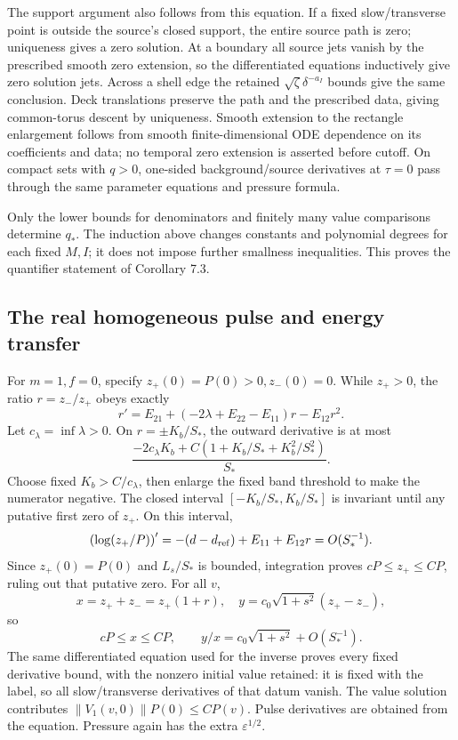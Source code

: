 \documentclass[10pt,a4paper]{article}
\begin{document}
The support argument also follows from this equation. If a fixed slow/transverse point is outside the source's closed support, the entire source path is zero; uniqueness gives a zero solution. At a boundary all source jets vanish by the prescribed smooth zero extension, so the differentiated equations inductively give zero solution jets. Across a shell edge the retained \(\sqrt\zeta\delta^{-a_I}\) bounds give the same conclusion. Deck translations preserve the path and the prescribed data, giving common-torus descent by uniqueness. Smooth extension to the rectangle enlargement follows from smooth finite-dimensional ODE dependence on its coefficients and data; no temporal zero extension is asserted before cutoff. On compact sets with \(q>0\), one-sided background/source derivatives at \(\tau=0\) pass through the same parameter equations and pressure formula.

Only the lower bounds for denominators and finitely many value comparisons determine \(q_*\). The induction above changes constants and polynomial degrees for each fixed \(M,I\); it does not impose further smallness inequalities. This proves the quantifier statement of Corollary 7.3.

\subsection{The real homogeneous pulse and energy transfer}\label{si:the-real-homogeneous-pulse-and-energy-transfer}

For \(m=1,f=0\), specify \(z_+(0)=P(0)>0,z_-(0)=0\). While \(z_+>0\), the ratio \(r=z_-/z_+\) obeys exactly \[
r'=E_{21}+(-2\lambda+E_{22}-E_{11})r-E_{12}r^2.
\] Let \(c_\lambda=\inf\lambda>0\). On \(r=\pm K_b/S_*\), the outward derivative is at most \[
\frac{-2c_\lambda K_b+C(1+K_b/S_*+K_b^2/S_*^2)}{S_*}.
\] Choose fixed \(K_b>C/c_\lambda\), then enlarge the fixed band threshold to make the numerator negative. The closed interval \([-K_b/S_*,K_b/S_*]\) is invariant until any putative first zero of \(z_+\). On this interval, \[
\left(\log(z_+/P)\right)'=-(d-d_{\rm ref})+E_{11}+E_{12}r=O(S_*^{-1}).
\] Since \(z_+(0)=P(0)\) and \(L_s/S_*\) is bounded, integration proves \(cP\le z_+\le CP\), ruling out that putative zero. For all \(v\), \[
x=z_++z_-=z_+(1+r),\quad
y=c_0\sqrt{1+s^2}(z_+-z_-),
\] so \[
cP\le x\le CP,\qquad
y/x=c_0\sqrt{1+s^2}+O(S_*^{-1}).
\] The same differentiated equation used for the inverse proves every fixed derivative bound, with the nonzero initial value retained: it is fixed with the label, so all slow/transverse derivatives of that datum vanish. The value solution contributes \(\|V_1(v,0)\|P(0)\le CP(v)\). Pulse derivatives are obtained from the equation. Pressure again has the extra \(\varepsilon^{1/2}\).
\end{document}
